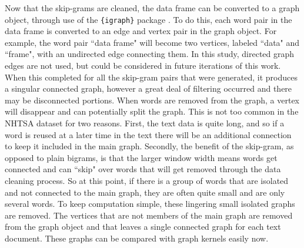 Now that the skip-grams are cleaned, the data frame can be converted to a graph object, through use of the \texttt{\{igraph\}} package \cite{csardi2013package}. To do this, each word pair in the data frame is converted to an edge and vertex pair in the graph object. For example, the word pair ``data frame" will become two vertices, labeled ``data" and ``frame", with an undirected edge connecting them. In this study, directed graph edges are not used, but could be considered in future iterations of this work. When this completed for all the skip-gram pairs that were generated, it produces a singular connected graph, however a great deal of filtering occurred and there may be disconnected portions. When words are removed from the graph, a vertex will disappear and can potentially split the graph. This is not too common in the NHTSA dataset for two reasons. First, the text data is quite long, and so if a word is reused at a later time in the text there will be an additional connection to keep it included in the main graph. Secondly, the benefit of the skip-gram, as opposed to plain bigrams, is that the larger window width means words get connected and can ``skip" over words that will get removed through the data cleaning process. So at this point, if there is a group of words that are isolated and not connected to the main graph, they are often quite small and are only several words. To keep computation simple, these lingering small isolated graphs are removed. The vertices that are not members of the main graph are removed from the graph object and that leaves a single connected graph for each text document. These graphs can be compared with graph kernels easily now. 


